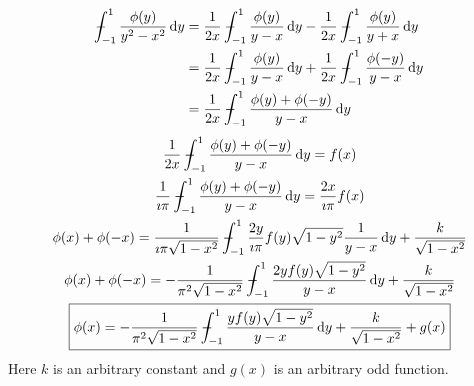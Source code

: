 \begin{Solution}
  \begin{align*}
    \pv\int_{-1}^1 \frac{ \phi(y) }{ y^2-x^2 }\,\dd y
    &= \frac{1}{2x} \pv\int_{-1}^1 \frac{ \phi(y) }{ y-x }\,\dd y
    - \frac{1}{2x} \pv\int_{-1}^1 \frac{ \phi(y) }{ y+x }\,\dd y \\
    &= \frac{1}{2x} \pv\int_{-1}^1 \frac{ \phi(y) }{ y-x }\,\dd y
    + \frac{1}{2x} \pv\int_{-1}^1 \frac{ \phi(-y) }{ y-x }\,\dd y \\
    &= \frac{1}{2x} \pv\int_{-1}^1 \frac{ \phi(y) + \phi(-y) }{ y-x }\,\dd y
  \end{align*}
  \begin{gather*}
    \frac{1}{2x} \pv\int_{-1}^1 \frac{ \phi(y) + \phi(-y) }{ y-x }\,\dd y = f(x) \\
    \frac{1}{\imath \pi} \pv\int_{-1}^1 \frac{ \phi(y) + \phi(-y) }{ y-x }\,\dd y 
    = \frac{2 x}{\imath \pi} f(x) \\
    \phi(x) + \phi(-x) = \frac{1}{\imath \pi \sqrt{1-x^2}}
    \pv\int_{-1}^1 \frac{2 y}{\imath \pi} f(y) \sqrt{1-y^2} \frac{1}{y-x} \,\dd y
    + \frac{k}{\sqrt{1-x^2}} \\
    \phi(x) + \phi(-x) = - \frac{1}{\pi^2 \sqrt{1-x^2}}
    \pv\int_{-1}^1 \frac{2 y f(y) \sqrt{1-y^2}}{y-x} \,\dd y
    + \frac{k}{\sqrt{1-x^2}} \\
    \boxed{
      \phi(x) = - \frac{1}{\pi^2 \sqrt{1-x^2}}
      \pv\int_{-1}^1 \frac{y f(y) \sqrt{1-y^2}}{y-x} \,\dd y
      + \frac{k}{\sqrt{1-x^2}} + g(x)
      }
  \end{gather*}
  Here $k$ is an arbitrary constant and $g(x)$ is an arbitrary odd function.
\end{Solution}



